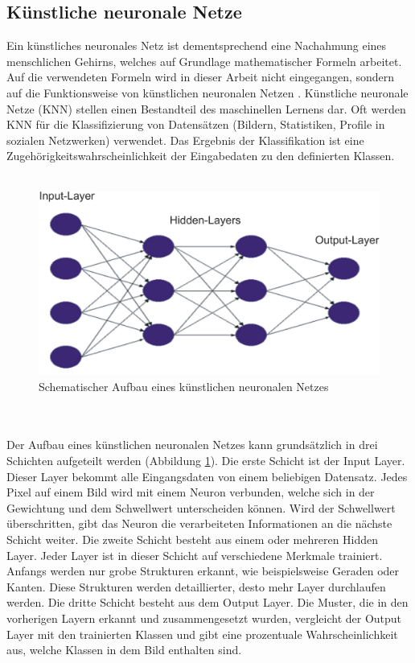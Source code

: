 \documentclass[a4paper,12pt,oneside]{article}
\begin{document}
\subsection{Künstliche neuronale Netze}
Ein künstliches neuronales Netz ist dementsprechend eine Nachahmung eines menschlichen Gehirns, welches auf Grundlage mathematischer Formeln arbeitet. Auf die verwendeten Formeln wird in dieser Arbeit nicht eingegangen, sondern auf die Funktionsweise von künstlichen neuronalen Netzen \cite[247-285]{ertel2013grundkurs}. Künstliche neuronale Netze (KNN) stellen einen Bestandteil des maschinellen Lernens dar. Oft werden KNN für die Klassifizierung von Datensätzen (Bildern, Statistiken, Profile in sozialen Netzwerken) verwendet. Das Ergebnis der Klassifikation ist eine Zugehörigkeitswahrscheinlichkeit der Eingabedaten zu den definierten Klassen.
\\
\\
\begin{figure}
	[h]
	\centering
	\includegraphics[scale=0.5]{Sources/nnet.png}
		\caption{Schematischer Aufbau eines künstlichen neuronalen Netzes \cite{bistra2018pic} }
	\label{img:KNN}
\end{figure}
\\
\\
Der Aufbau eines künstlichen neuronalen Netzes kann grundsätzlich in drei Schichten aufgeteilt werden (Abbildung \ref{img:KNN}). Die erste Schicht ist der \glqq Input Layer\grqq. Dieser \glqq Layer\grqq{} bekommt alle Eingangsdaten von einem beliebigen Datensatz. Jedes Pixel auf einem Bild wird mit einem Neuron verbunden, welche sich in der Gewichtung und dem Schwellwert unterscheiden können. Wird der Schwellwert überschritten, gibt das Neuron die verarbeiteten Informationen an die nächste Schicht weiter. Die zweite Schicht besteht aus einem oder mehreren \glqq Hidden Layer\grqq. Jeder \glqq Layer\grqq{} ist in dieser Schicht auf verschiedene Merkmale trainiert. Anfangs werden nur grobe Strukturen erkannt, wie beispielsweise Geraden oder Kanten. Diese Strukturen werden detaillierter, desto mehr \glqq Layer\grqq{} durchlaufen werden. Die dritte Schicht besteht aus dem \glqq Output Layer\grqq. Die Muster, die in den vorherigen Layern erkannt und zusammengesetzt wurden, vergleicht der \glqq Output Layer\grqq{} mit den trainierten Klassen und gibt eine prozentuale Wahrscheinlichkeit aus, welche Klassen in dem Bild enthalten sind.
\end{document}
